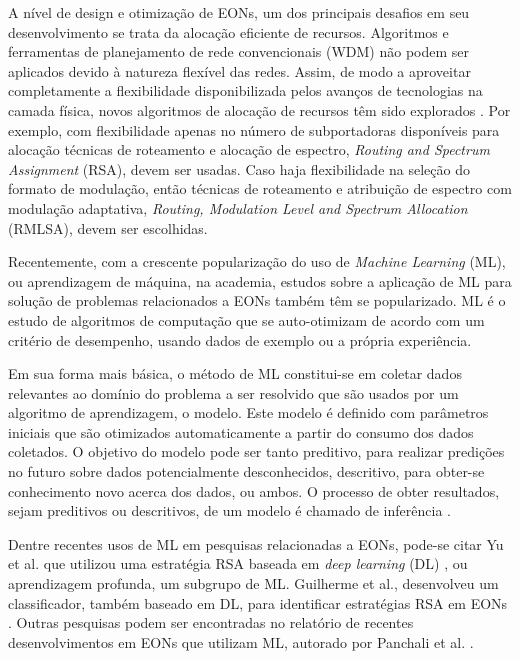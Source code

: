 A nível de design e otimização de EONs, um dos principais desafios em seu desenvolvimento se trata da alocação eficiente de recursos. Algoritmos e ferramentas de planejamento de rede convencionais (WDM) não podem ser aplicados devido à natureza flexível das redes. Assim, de modo a aproveitar completamente a flexibilidade disponibilizada pelos avanços de tecnologias na camada física, novos algoritmos de alocação de recursos têm sido explorados \cite{eon_tutorial_2014, eon_allocation_2011, eon_allocation_2011_2, eon_allocation_2016, eon_allocation_2017}. Por exemplo, com flexibilidade apenas no número de subportadoras disponíveis para alocação técnicas de roteamento e alocação de espectro, \textit{Routing and Spectrum Assignment} (RSA), devem ser usadas. Caso haja flexibilidade na seleção do formato de modulação, então técnicas de roteamento e atribuição de espectro com modulação adaptativa, \textit{Routing, Modulation Level and Spectrum Allocation} (RMLSA), devem ser escolhidas.

Recentemente, com a crescente popularização do uso de \textit{Machine Learning} (ML), ou aprendizagem de máquina, na academia, estudos sobre a aplicação de ML para solução de problemas relacionados a EONs também têm se popularizado. ML é o estudo de algoritmos de computação que se auto-otimizam de acordo com um critério de desempenho, usando dados de exemplo ou a própria experiência. \cite{mitchell1997ml} \cite{alpaydin2020introduction}

Em sua forma mais básica, o método de ML constitui-se em coletar dados relevantes ao domínio do problema a ser resolvido que são usados por um algoritmo de aprendizagem, o modelo. Este modelo é definido com parâmetros iniciais que são otimizados automaticamente a partir do consumo dos dados coletados. O objetivo do modelo pode ser tanto preditivo, para realizar predições no futuro sobre dados potencialmente desconhecidos, descritivo, para obter-se conhecimento novo acerca dos dados, ou ambos. O processo de obter resultados, sejam preditivos ou descritivos, de um modelo é chamado de inferência \cite{alpaydin2020introduction, brief_introduction_to_ml}.

Dentre recentes usos de ML em pesquisas relacionadas a EONs, pode-se citar Yu et al. que utilizou uma estratégia RSA baseada em \textit{deep learning} (DL) \cite{eon_ml_rsa_dl_2019}, ou aprendizagem profunda, um subgrupo de ML. Guilherme et al., desenvolveu um classificador, também baseado em DL, para identificar estratégias RSA em EONs \cite{eon_ml_classifier_2020}. Outras pesquisas podem ser encontradas no relatório de recentes desenvolvimentos em EONs que utilizam ML, autorado por Panchali et al. \cite{eon_ml_recent_2019}.


